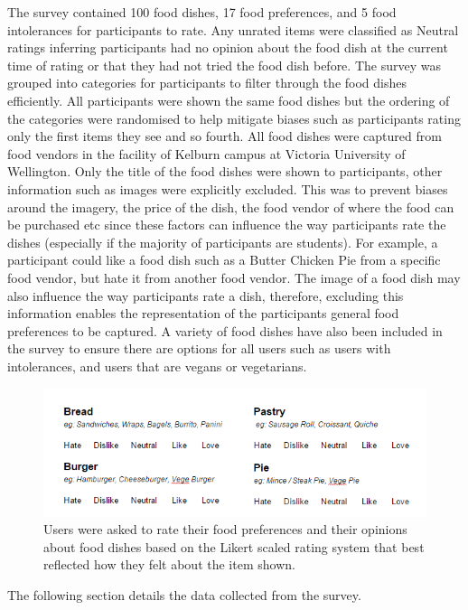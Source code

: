 The survey contained 100 food dishes, 17 food preferences, and 5 food intolerances for participants to rate. Any unrated items were classified as Neutral ratings inferring participants had no opinion about the food dish at the current time of rating or that they had not tried the food dish before. The survey was grouped into categories for participants to filter through the food dishes efficiently. All participants were shown the same food dishes but the ordering of the categories were randomised to help mitigate biases such as participants rating only the first items they see and so fourth. All food dishes were captured from food vendors in the facility of Kelburn campus at Victoria University of Wellington. Only the title of the food dishes were shown to participants, other information such as images were explicitly excluded. This was to prevent biases around the imagery, the price of the dish, the food vendor of where the food can be purchased etc since these factors can influence the way participants rate the dishes (especially if the majority of participants are students). For example, a participant could like a food dish such as a Butter Chicken Pie from a specific food vendor, but hate it from another food vendor. The image of a food dish may also influence the way participants rate a dish, therefore, excluding this information enables the representation of the participants general food preferences to be captured. A variety of food dishes have also been included in the survey to ensure there are options for all users such as users with intolerances, and users that are vegans or vegetarians. 

\begin{figure}
\centering
\includegraphics[scale=0.4]{images/survey_preferences.png}
\caption{Users were asked to rate their food preferences and their opinions about food dishes based on the Likert scaled rating system that best reflected how they felt about the item shown.}
\label{fig:survey}
\end{figure}

The following section details the data collected from the survey. 

